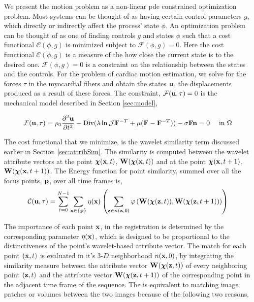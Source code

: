 We present the motion problem as a non-linear pde constrained optimization problem. Most systems can be thought of as having certain control parameters $g$, which directly or indirectly affect the process' state $\phi$. An optimization problem can be thought of as one of finding controls $g$ and states $\phi$ such that a cost functional $\mathcal{C}(\phi, g)$ is minimized subject to $\mathcal{F}(\phi, g)=0$.  Here the cost functional $\mathcal{C}(\phi, g)$ is a measure of the how close the current state is to the desired one. $\mathcal{F}(\phi, g)=0$ is a constraint on the relationship between the states and the controls. For the problem of cardiac motion estimation, we solve for the forces $\tau$ in the myocardial fibers and obtain the states $\mathbf{u}$, the displacements produced as a result of these forces. The constraint, $\mathcal{F}(\mathbf{u}, \tau)=0$ is the mechanical model described in Section \ref{sec:model},

\[
\mathcal{F}(\mathbf{u}, \tau) = \rho_0\frac{\partial^2 \mathbf{u}}{\partial t^2} - \mbox{Div}(\lambda \ln\mathcal{J}\mathbf{F}^{-T} + \mu(\mathbf{F} -\mathbf{F}^{-T})) - \sigma\mathbf{F}\mathbf{n} = 0 \mbox{~~~~in~} \Omega
\]

The cost functional that we minimize, is the wavelet similarity term discussed earlier in Section \ref{sec:attribSim}. The similarity is computed between the wavelet attribute vectors at the point ${\boldsymbol{\chi}} ( \mathbf{x}, t )$, $\mathbf{W} ( {\boldsymbol{\chi}} ( \mathbf{x}, t ) )$ and at the point ${\boldsymbol{\chi}} ( \mathbf{x}, t + 1 )$, $\mathbf{W} ( {\boldsymbol{\chi}} ( \mathbf{x}, t + 1 ) )$. The Energy function for point similarity, summed over all the focus points, $\mathbf{p}$, over all time frames is,
\begin{equation} 
\label{eq:wav-sim}
   \mathcal{C}(\mathbf{u}, \tau) = \sum_{t = 0}^{N - 1} \sum_{\mathbf{x} \in \{\mathbf{p} \}} \eta (
     \mathbf{x}) \left( \sum_{\mathbf{z} \in n ( \mathbf{x}, 0 )} \varphi \left(
     \mathbf{W} ( {\boldsymbol{\chi}} ( \mathbf{z}, t ) ), \mathbf{W} ( {\boldsymbol{\chi}} ( \mathbf{z}, t + 1 ) ) \right)
     \right) 
\end{equation}

The importance of each point $\mathbf{x}$, in the registration is determined by the corresponding parameter $\eta (\mathbf{x} )$, which is designed to be proportional to the distinctiveness of the point's wavelet-based attribute vector. The match for each point $(\mathbf{x}, t)$ is evaluated in it's 3-$D$ neighborhood $n ( \mathbf{x}, 0 )$, by integrating the similarity measure between the attribute vector $\mathbf{W}( {\boldsymbol{\chi}} ( \mathbf{z}, t ) )$  of every neighboring point $( \mathbf{z}, t )$ and the attribute vector $\mathbf{W} ( {\boldsymbol{\chi}} ( \mathbf{z}, t+1 ) )$ of the corresponding point in the adjacent time frame of the sequence. The is equivalent to matching image patches or volumes between the two images because of the following two reasons,

